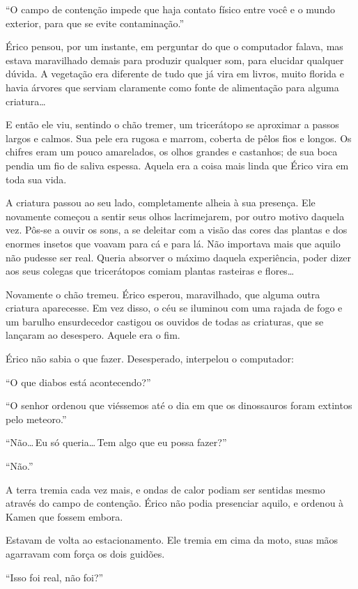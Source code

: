 “O campo de contenção impede que haja contato físico entre você e o
mundo exterior, para que se evite contaminação.”

Érico pensou, por um instante, em perguntar do que o computador falava,
mas estava maravilhado demais para produzir qualquer som, para elucidar
qualquer dúvida. A vegetação era diferente de tudo que já vira em
livros, muito florida e havia árvores que serviam claramente como fonte
de alimentação para alguma criatura\ldots

E então ele viu, sentindo o chão tremer, um tricerátopo se aproximar a
passos largos e calmos. Sua pele era rugosa e marrom, coberta de pêlos
fios e longos. Os chifres eram um pouco amarelados, os olhos grandes e
castanhos; de sua boca pendia um fio de saliva espessa. Aquela era a
coisa mais linda que Érico vira em toda sua vida.

A criatura passou ao seu lado, completamente alheia à sua presença. Ele
novamente começou a sentir seus olhos lacrimejarem, por outro motivo
daquela vez. Pôs-se a ouvir os sons, a se deleitar com a visão das cores
das plantas e dos enormes insetos que voavam para cá e para lá. Não
importava mais que aquilo não pudesse ser real. Queria absorver o máximo
daquela experiência, poder dizer aos seus colegas que tricerátopos
comiam plantas rasteiras e flores\ldots

Novamente o chão tremeu. Érico esperou, maravilhado, que alguma outra
criatura aparecesse. Em vez disso, o céu se iluminou com uma rajada de
fogo e um barulho ensurdecedor castigou os ouvidos de todas as
criaturas, que se lançaram ao desespero. Aquele era o fim.

Érico não sabia o que fazer. Desesperado, interpelou o computador:

“O que diabos está acontecendo?”

“O senhor ordenou que viéssemos até o dia em que os dinossauros foram
extintos pelo meteoro.”

“Não\ldots\,Eu só queria\ldots\,Tem algo que eu possa fazer?”

“Não.”

A terra tremia cada vez mais, e ondas de calor podiam ser sentidas mesmo
através do campo de contenção. Érico não podia presenciar aquilo, e
ordenou à Kamen que fossem embora.

Estavam de volta ao estacionamento. Ele tremia em cima da moto, suas
mãos agarravam com força os dois guidões.

“Isso foi real, não foi?”

